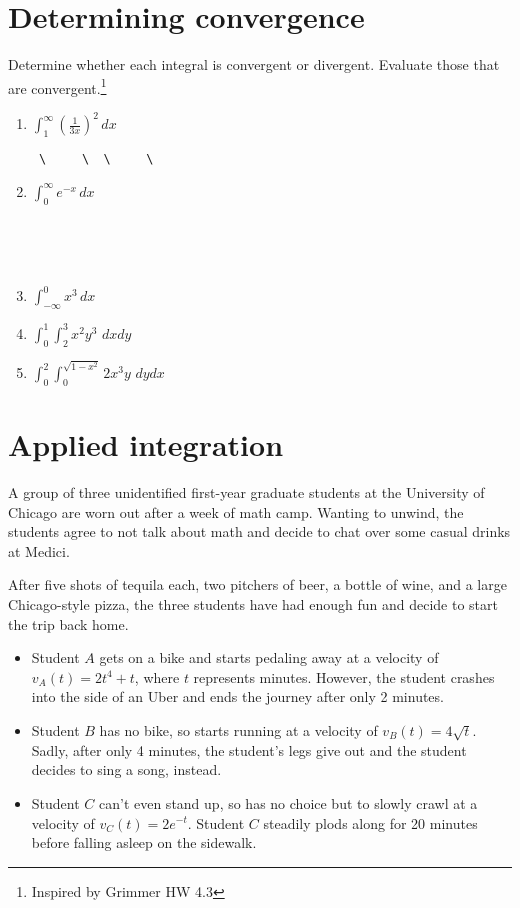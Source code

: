 \documentclass[
]{article}
\providecommand{\tightlist}{%
  \setlength{\itemsep}{0pt}\setlength{\parskip}{0pt}}
\begin{document}
\section{Determining convergence}\label{determining-convergence}

Determine whether each integral is convergent or divergent. Evaluate
those that are convergent.\footnote{Inspired by Grimmer HW 4.3}

\begin{enumerate}
\def\labelenumi{\alph{enumi}.}
\item
  \(\int_1^{\infty} \left(\frac{1}{3x}\right)^2 \,dx\)

\begin{verbatim}
 \     \  \     \ 
\end{verbatim}
\item
  \(\int_0^{\infty} e^{-x} \,dx\)

  \strut \\
  \strut ~ ~ ~ ~
\item
  \(\int_{-\infty}^0 x^3 \,dx\)
\item
  \(\int_{0}^1 \int_{2}^{3} x^2y^3 \,\, dxdy\)
\item
  \(\int_{0}^2 \int_0^{\sqrt{1-x^2}} 2x^3y \, \, dy dx\)
\end{enumerate}

\newpage

\section{Applied integration}\label{applied-integration}

A group of three unidentified first-year graduate students at the
University of Chicago are worn out after a week of math camp. Wanting to
unwind, the students agree to not talk about math and decide to chat
over some casual drinks at Medici.

After five shots of tequila each, two pitchers of beer, a bottle of
wine, and a large Chicago-style pizza, the three students have had
enough fun and decide to start the trip back home.

\begin{itemize}
\tightlist
\item
  Student \(A\) gets on a bike and starts pedaling away at a velocity of
  \(v_A(t) = 2t^4 + t\), where \(t\) represents minutes. However, the
  student crashes into the side of an Uber and ends the journey after
  only 2 minutes.
\item
  Student \(B\) has no bike, so starts running at a velocity of
  \(v_B(t) = 4\sqrt{t}\). Sadly, after only 4 minutes, the student's
  legs give out and the student decides to sing a song, instead.
\item
  Student \(C\) can't even stand up, so has no choice but to slowly
  crawl at a velocity of \(v_C(t) = 2e^{-t}\). Student \(C\) steadily
  plods along for 20 minutes before falling asleep on the sidewalk.
\end{itemize}
\end{document}
